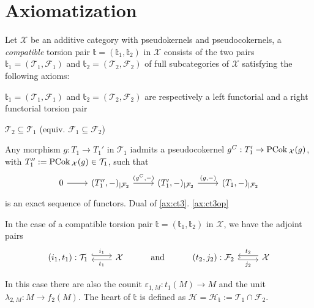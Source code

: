 \clearpage

\section{Axiomatization}

\begin{definition}
  Let $\mathcal{X}$ be an additive category with pseudokernels and pseudocokernels, a \emph{compatible}
  torsion pair $\mathbb{t}=(\mathbb{t}_1,\mathbb{t}_2)$ in $\mathcal{X}$ consists of the two pairs
  $\mathbb{t}_1=(\mathcal{T}_1,\mathcal{F}_1)$ and $\mathbb{t}_2=(\mathcal{T}_2,\mathcal{F}_2)$ of full subcategories
  of $\mathcal{X}$ satisfying the following axioms:

  \begin{torsionaxioms}
    \item\label{ax:ct1} $\mathbb{t}_1=(\mathcal{T}_1,\mathcal{F}_1)$ and $\mathbb{t}_2=(\mathcal{T}_2,\mathcal{F}_2)$ are respectively a left functorial and a
    right functorial torsion pair 
    \item\label{ax:ct2} $\mathcal{T}_2\subseteq \mathcal{T}_1$ (equiv. $\mathcal{F}_1\subseteq\mathcal{F}_2$)
    \item\label{ax:ct3} Any morphism $g:T_1\to T_1'$ in $\mathcal{T}_1$ iadmits a pseudocokernel $g^C:T_1'\to\mathrm{\textup{PCok\,}}_\mathcal{X}(g)$,
    with $T_1'':=\mathrm{\textup{PCok\,}}_\mathcal{X}(g)\in\mathcal{T}_1$, such that
    \begin{equation*}
      \begin{tikzcd}
        0\arrow{r} &(T_1'',-)_{|\mathcal{F}_2}\arrow{r}{(g^C,-)}
        & (T_1',-)_{|\mathcal{F}_2}\arrow{r}{(g,-)}& (T_1,-)_{|\mathcal{F}_2}
      \end{tikzcd}
    \end{equation*}
    is an exact sequence of functors.
    \varitem{^\ast}\label{ax:ct3op} Dual of \ref{ax:ct3}. \ref{ax:ct3op}
  \end{torsionaxioms}
\end{definition}

\begin{notation}
  In the case of a compatible torsion pair $\mathbb{t}=(\mathbb{t}_1,\mathbb{t}_2)$ in $\mathcal{X}$,
  we have the adjoint pairs
  \begin{equation*}
    \begin{tikzcd}
      (i_1,t_1):\mathcal{T}_1\arrow[hook, shift left]{r}{i_1}
        & \mathcal{X}\arrow[shift left]{l}{t_1}
        & \mathrm{and}
        & (t_2,j_2):\mathcal{F}_2\arrow[hook, shift right]{r}[']{j_2}
          & \mathcal{X}\arrow[shift right]{l}[']{t_2}
    \end{tikzcd}
  \end{equation*}

  In this case there are also the counit $\varepsilon_{1,M}:t_1(M)\to M$ and the
  unit $\lambda_{2,M}:M\to f_2(M)$. The heart of $\mathbb{t}$ is defined as
  $\mathcal{H}=\mathcal{H}_\mathbb{t}:=\mathcal{T}_1\cap\mathcal{F}_2$.
\end{notation}

